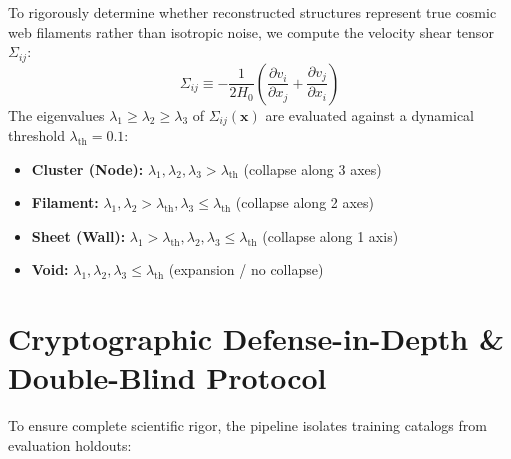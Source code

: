 \documentclass[11pt,a4paper]{article}
\begin{document}
To rigorously determine whether reconstructed structures represent true cosmic web filaments rather than isotropic noise, we compute the velocity shear tensor $\Sigma_{ij}$:
\begin{equation}
\Sigma_{ij} \equiv -\frac{1}{2 H_0} \left( \frac{\partial v_i}{\partial x_j} + \frac{\partial v_j}{\partial x_i} \right)
\end{equation}
The eigenvalues $\lambda_1 \ge \lambda_2 \ge \lambda_3$ of $\Sigma_{ij}(\mathbf{x})$ are evaluated against a dynamical threshold $\lambda_{\text{th}} = 0.1$:
\begin{itemize}
    \item \textbf{Cluster (Node):} $\lambda_1, \lambda_2, \lambda_3 > \lambda_{\text{th}}$ (collapse along 3 axes)
    \item \textbf{Filament:} $\lambda_1, \lambda_2 > \lambda_{\text{th}}, \lambda_3 \le \lambda_{\text{th}}$ (collapse along 2 axes)
    \item \textbf{Sheet (Wall):} $\lambda_1 > \lambda_{\text{th}}, \lambda_2, \lambda_3 \le \lambda_{\text{th}}$ (collapse along 1 axis)
    \item \textbf{Void:} $\lambda_1, \lambda_2, \lambda_3 \le \lambda_{\text{th}}$ (expansion / no collapse)
\end{itemize}

\section{Cryptographic Defense-in-Depth \& Double-Blind Protocol}

To ensure complete scientific rigor, the pipeline isolates training catalogs from evaluation holdouts:

\begin{table}[htbp]
\centering
\small
\caption{Astronomical Catalog Provenance and Role Separation.}
\label{tab:catalogs}
\vspace{0.5em}
\end{table}
\end{document}
